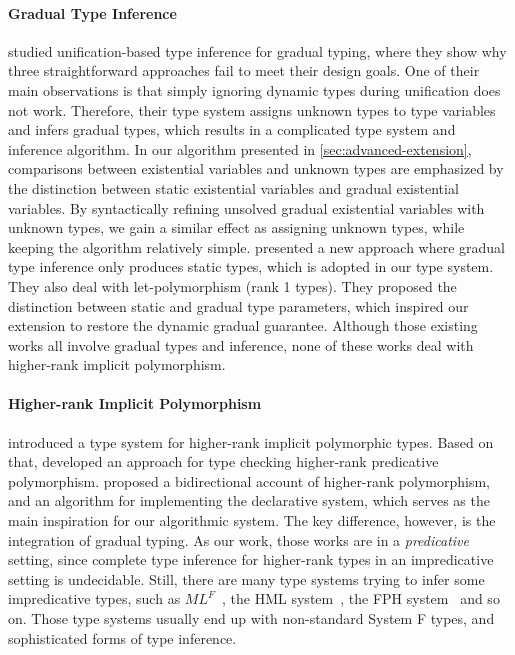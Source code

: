 \paragraph{Gradual Type Inference}
\citet{siek2008gradual} studied unification-based type inference for gradual
typing, where they show why three straightforward approaches fail to meet their
design goals. One of their main observations is
that simply ignoring dynamic types during unification does not work. Therefore,
their type system assigns unknown types to type variables and infers gradual
types, which results in a complicated type system and inference algorithm. In
our algorithm presented in \cref{sec:advanced-extension}, comparisons between
existential variables and unknown types are emphasized by the distinction
between static existential variables and gradual existential variables. By
syntactically refining unsolved gradual existential variables with unknown types, we gain a
similar effect as assigning unknown types, while keeping the algorithm relatively
simple.
\citet{garcia2015principal} presented a new approach where gradual type
inference only produces static types, which is adopted in our type system. They
also deal with let-polymorphism (rank 1 types). They proposed the distinction
between static and gradual type parameters, which inspired our extension to
restore the dynamic gradual guarantee. Although those existing works all involve
gradual types and inference, none of these works deal with higher-rank
implicit polymorphism.


\paragraph{Higher-rank Implicit Polymorphism}

\citet{odersky1996putting} introduced a type system for higher-rank implicit
polymorphic types. Based on that, \citet{jones2007practical} developed an
approach for type checking higher-rank predicative polymorphism.
\citet{dunfield2013complete} proposed a bidirectional account of higher-rank
polymorphism, and an algorithm for implementing the declarative system, which
serves as the main inspiration for our algorithmic system. The key difference,
however, is the integration of gradual typing.
As our work, those works are in a
\emph{predicative} setting, since complete type inference for higher-rank
types in an impredicative setting is undecidable. Still, there are many type
systems trying to infer some impredicative types, such as
\texttt{$ML^F$}~\citep{le2014mlf,remy2008graphic,le2009recasting}, the HML
system~\citep{leijen2009flexible}, the FPH system~\citep{vytiniotis2008fph} and
so on. Those type systems usually end up with non-standard System F types, and
sophisticated forms of type inference.

